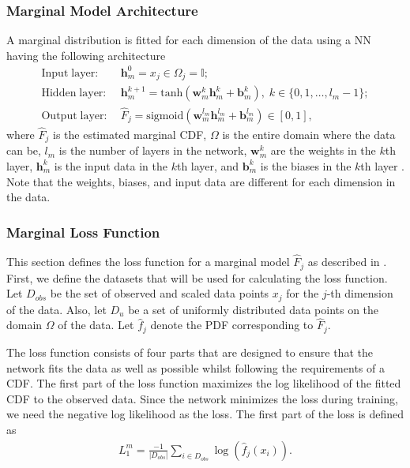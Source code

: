 \subsubsection{Marginal Model Architecture}
A marginal distribution is fitted for each dimension of the data using a \gls{NN} having the following architecture 
\begin{align*}
    \mathrm{Input\;layer:} \; & \mathbf{h}_m^0 = x_j \in \Omega_j = \mathbb{I}; \\
    \mathrm{Hidden\;layer:} \; & \mathbf{h}_m^{k+1} = \mathrm{tanh}(\mathbf{w}_m^{k} \mathbf{h}_m^{k} + \mathbf{b}_m^{k}), \; k \in \{0,1, \dots, l_m -1 \};\\
    \mathrm{Output\;layer:} \; & \hat{F}_j = \mathrm{sigmoid}(\mathbf{w}_m^{l_m} \mathbf{h}_m^{l_m} + \mathbf{b}_m^{l_m}) \in \left[0,1 \right],
\end{align*}
where $\hat{F}_j$ is the estimated marginal \gls{CDF}, $\Omega$ is the entire domain where the data can be, $l_m$ is the number of layers in the network, $\mathbf{w}_m^{k}$ are the weights in the $k$th layer,  $\mathbf{h}_m^{k}$ is the input data in the $k$th layer, and $\mathbf{b}_m^{k}$ is the biases in the $k$th layer . Note that the weights, biases, and input data are different for each dimension in the data. 

\subsubsection{Marginal Loss Function}\label{sec:NeuralMarginalLoss}
This section defines the loss function for a marginal model $\hat{F}_j$ as described in . First, we define the datasets that will be used for calculating the loss function. Let $D_{obs}$ be the set of observed and scaled data points $x_j$ for the $j$-th dimension of the data. Also, let $D_u$ be a set of uniformly distributed data points on the domain $\Omega$ of the data. Let $\hat{f}_j$ denote the \gls{PDF} corresponding to $\hat{F}_j$.

The loss function consists of four parts that are designed to ensure that the network fits the data as well as possible whilst following the requirements of a \gls{CDF}. The first part of the loss function maximizes the log likelihood of the fitted \gls{CDF} to the observed data. Since the network minimizes the loss during training, we need the negative log likelihood as the loss. The first part of the loss is defined as
\begin{align*}
    L_1^m = \frac{-1}{|D_{obs}|} \sum_{i \in D_{obs}} \log(\hat{f}_j(x_i)).
\end{align*}

